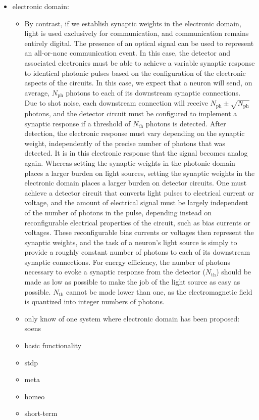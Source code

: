 \begin{itemize}
\item electronic domain:
\begin{itemize}
\item By contrast, if we establish synaptic weights in the electronic domain, light is used exclusively for communication, and communication remains entirely digital. The presence of an optical signal can be used to represent an all-or-none communication event. In this case, the detector and associated electronics must be able to achieve a variable synaptic response to identical photonic pulses based on the configuration of the electronic aspects of the circuits. In this case, we expect that a neuron will send, on average, $N_{\mathrm{ph}}$ photons to each of its downstream synaptic connections. Due to shot noise, each downstream connection will receive $N_{\mathrm{ph}}\pm\sqrt{N_{\mathrm{ph}}}$ photons, and the detector circuit must be configured to implement a synaptic response if a threshold of $N_{\mathrm{th}}$ photons is detected. After detection, the electronic response must vary depending on the synaptic weight, independently of the precise number of photons that was detected. It is in this electronic response that the signal becomes analog again. Whereas setting the synaptic weights in the photonic domain places a larger burden on light sources, setting the synaptic weights in the electronic domain places a larger burden on detector circuits. One must achieve a detector circuit that converts light pulses to electrical current or voltage, and the amount of electrical signal must be largely independent of the number of photons in the pulse, depending instead on reconfigurable electrical properties of the circuit, such as bias currents or voltages. These reconfigurable bias currents or voltages then represent the synaptic weights, and the task of a neuron's light source is simply to provide a roughly constant number of photons to each of its downstream synaptic connections. For energy efficiency, the number of photons necessary to evoke a synaptic response from the detector ($N_{\mathrm{th}}$) should be made as low as possible to make the job of the light source as easy as possible. $N_{\mathrm{th}}$ cannot be made lower than one, as the electromagnetic field is quantized into integer numbers of photons.
\item only know of one system where electronic domain has been proposed: soens
\item basic functionality
\item stdp
\item meta
\item homeo
\item short-term
\end{itemize}


\end{itemize}
